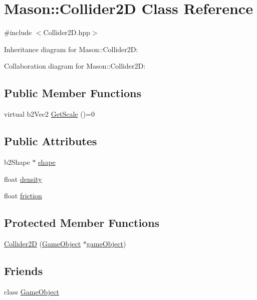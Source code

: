 \hypertarget{class_mason_1_1_collider2_d}{}\section{Mason\+:\+:Collider2D Class Reference}
\label{class_mason_1_1_collider2_d}


{\ttfamily \#include $<$Collider2\+D.\+hpp$>$}



Inheritance diagram for Mason\+:\+:Collider2D\+:


Collaboration diagram for Mason\+:\+:Collider2D\+:
\subsection*{Public Member Functions}
\begin{DoxyCompactItemize}
\item 
virtual b2\+Vec2 \hyperlink{class_mason_1_1_collider2_d_a3394739f1fea805691ac2753a9272156}{Get\+Scale} ()=0
\end{DoxyCompactItemize}
\subsection*{Public Attributes}
\begin{DoxyCompactItemize}
\item 
b2\+Shape $\ast$ \hyperlink{class_mason_1_1_collider2_d_a82de033fe10f7da3fd079c7ff54eaf94}{shape}
\item 
float \hyperlink{class_mason_1_1_collider2_d_ad3b9178c829dbe0a8a25a75d643f8744}{density}
\item 
float \hyperlink{class_mason_1_1_collider2_d_ab08954cffa1ac7539e26c4e2da535481}{friction}
\end{DoxyCompactItemize}
\subsection*{Protected Member Functions}
\begin{DoxyCompactItemize}
\item 
\hyperlink{class_mason_1_1_collider2_d_a7ac26a9d09d5380b49027e9ae50fdacc}{Collider2D} (\hyperlink{class_mason_1_1_game_object}{Game\+Object} $\ast$\hyperlink{class_mason_1_1_component_a30030370c35f5562cbbbb0927b0448c8}{game\+Object})
\end{DoxyCompactItemize}
\subsection*{Friends}
\begin{DoxyCompactItemize}
\item 
class \hyperlink{class_mason_1_1_collider2_d_a00df87c957d8f7ee0fc51f07a0542f4a}{Game\+Object}
\end{DoxyCompactItemize}
